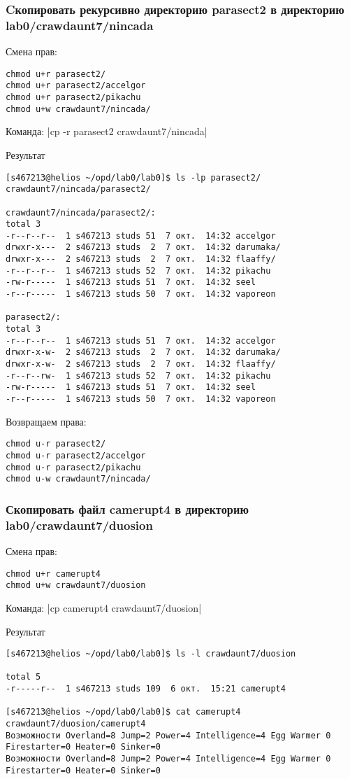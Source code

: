 \subsubsection*{Cкопировать рекурсивно директорию parasect2 в директорию lab0/crawdaunt7/nincada}
Смена прав: 
\begin{verbatim}
chmod u+r parasect2/
chmod u+r parasect2/accelgor
chmod u+r parasect2/pikachu
chmod u+w crawdaunt7/nincada/
\end{verbatim}

Команда: |cp -r parasect2 crawdaunt7/nincada|

Результат
\begin{verbatim}
[s467213@helios ~/opd/lab0/lab0]$ ls -lp parasect2/ crawdaunt7/nincada/parasect2/

crawdaunt7/nincada/parasect2/:
total 3
-r--r--r--  1 s467213 studs 51  7 окт.  14:32 accelgor
drwxr-x---  2 s467213 studs  2  7 окт.  14:32 darumaka/
drwxr-x---  2 s467213 studs  2  7 окт.  14:32 flaaffy/
-r--r--r--  1 s467213 studs 52  7 окт.  14:32 pikachu
-rw-r-----  1 s467213 studs 51  7 окт.  14:32 seel
-r--r-----  1 s467213 studs 50  7 окт.  14:32 vaporeon

parasect2/:
total 3
-r--r--r--  1 s467213 studs 51  7 окт.  14:32 accelgor
drwxr-x-w-  2 s467213 studs  2  7 окт.  14:32 darumaka/
drwxr-x-w-  2 s467213 studs  2  7 окт.  14:32 flaaffy/
-r--r--rw-  1 s467213 studs 52  7 окт.  14:32 pikachu
-rw-r-----  1 s467213 studs 51  7 окт.  14:32 seel
-r--r-----  1 s467213 studs 50  7 окт.  14:32 vaporeon
\end{verbatim}

Возвращаем права:
\begin{verbatim}
chmod u-r parasect2/
chmod u-r parasect2/accelgor
chmod u-r parasect2/pikachu
chmod u-w crawdaunt7/nincada/
\end{verbatim}

\subsubsection*{Скопировать файл camerupt4 в директорию lab0/crawdaunt7/duosion}
Смена прав: 
\begin{verbatim}
chmod u+r camerupt4
chmod u+w crawdaunt7/duosion
\end{verbatim}

Команда: |cp camerupt4 crawdaunt7/duosion|

Результат
\begin{verbatim}
[s467213@helios ~/opd/lab0/lab0]$ ls -l crawdaunt7/duosion

total 5
-r-----r--  1 s467213 studs 109  6 окт.  15:21 camerupt4

[s467213@helios ~/opd/lab0/lab0]$ cat camerupt4 crawdaunt7/duosion/camerupt4
Возможности Overland=8 Jump=2 Power=4 Intelligence=4 Egg Warmer 0 Firestarter=0 Heater=0 Sinker=0
Возможности Overland=8 Jump=2 Power=4 Intelligence=4 Egg Warmer 0 Firestarter=0 Heater=0 Sinker=0
\end{verbatim}

